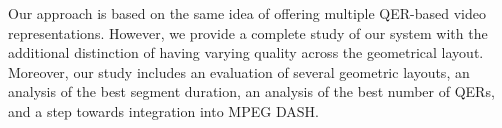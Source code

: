 Our approach is based on the same
idea of offering multiple \ac{QER}-based video representations.
However, we provide a complete study of our system with the additional
distinction of having varying quality across the geometrical layout. Moreover,
our study includes an evaluation of several
geometric layouts, an analysis of the best segment duration, an
analysis of the best number of \acp{QER},
and a step towards integration into \ac{MPEG} \ac{DASH}.

